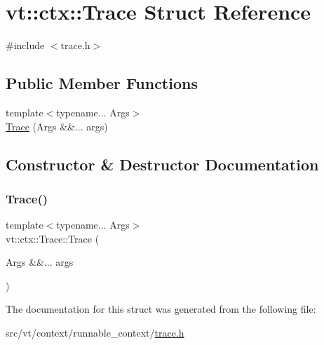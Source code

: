 \hypertarget{structvt_1_1ctx_1_1_trace}{}\section{vt\+:\+:ctx\+:\+:Trace Struct Reference}
\label{structvt_1_1ctx_1_1_trace}


{\ttfamily \#include $<$trace.\+h$>$}

\subsection*{Public Member Functions}
\begin{DoxyCompactItemize}
\item 
{\footnotesize template$<$typename... Args$>$ }\\\hyperlink{structvt_1_1ctx_1_1_trace_a833a6404ae6cfe8d26e1e3ca7185119b}{Trace} (Args \&\&... args)
\end{DoxyCompactItemize}


\subsection{Constructor \& Destructor Documentation}
\mbox{\label{structvt_1_1ctx_1_1_trace_a833a6404ae6cfe8d26e1e3ca7185119b}} 
\subsubsection{\texorpdfstring{Trace()}{Trace()}}
{\footnotesize\ttfamily template$<$typename... Args$>$ \\
vt\+::ctx\+::\+Trace\+::\+Trace (\begin{DoxyParamCaption}\item[{Args \&\&...}]{args }\end{DoxyParamCaption})\hspace{0.3cm}{\ttfamily [inline]}}



The documentation for this struct was generated from the following file\+:\begin{DoxyCompactItemize}
\item 
src/vt/context/runnable\+\_\+context/\hyperlink{context_2runnable__context_2trace_8h}{trace.\+h}\end{DoxyCompactItemize}
